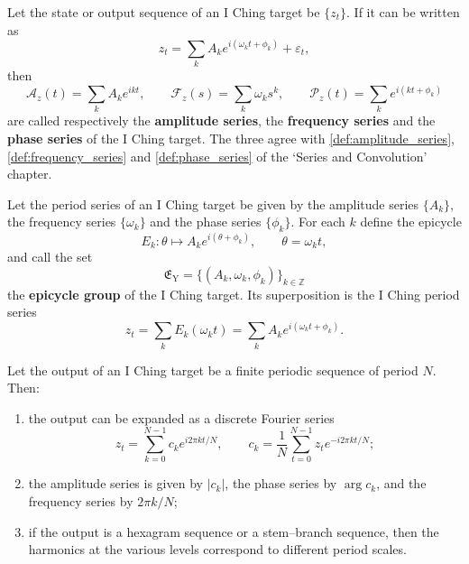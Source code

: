 \begin{definition}\label{def:yijing_series}
Let the state or output sequence of an I Ching target be $\{z_t\}$. If it can be written as
\[
z_t=\sum_k A_k e^{i(\omega_k t+\phi_k)}+\varepsilon_t,
\]
then
\[
\mathcal A_z(t)=\sum_k A_k e^{ikt},\qquad
\mathcal F_z(s)=\sum_k \omega_k s^k,\qquad
\mathcal P_z(t)=\sum_k e^{i(kt+\phi_k)}
\]
are called respectively the \textbf{amplitude series}, the \textbf{frequency series} and the \textbf{phase series} of the I Ching target. The three agree with \cref{def:amplitude_series}, \cref{def:frequency_series} and \cref{def:phase_series} of the `Series and Convolution' chapter.
\end{definition}

\begin{definition}\label{def:yijing_epicycle_group}
Let the period series of an I Ching target be given by the amplitude series $\{A_k\}$, the frequency series $\{\omega_k\}$ and the phase series $\{\phi_k\}$. For each $k$ define the epicycle
\[
E_k:\theta\mapsto A_k e^{i(\theta+\phi_k)},\qquad \theta=\omega_k t,
\]
and call the set
\[
\mathfrak E_{\mathrm{Y}}=\{(A_k,\omega_k,\phi_k)\}_{k\in\mathbb Z}
\]
the \textbf{epicycle group} of the I Ching target. Its superposition is the I Ching period series
\[
z_t=\sum_k E_k(\omega_k t)=\sum_k A_k e^{i(\omega_k t+\phi_k)}.
\]
\end{definition}

\begin{theorem}\label{thm:yijing_series_reconstruction}
Let the output of an I Ching target be a finite periodic sequence of period $N$. Then:
\begin{enumerate}[label=(\roman*)]
    \item the output can be expanded as a discrete Fourier series
    \[
    z_t=\sum_{k=0}^{N-1}c_k e^{i2\pi kt/N},\qquad
    c_k=\frac1N\sum_{t=0}^{N-1}z_t e^{-i2\pi kt/N};
    \]
    \item the amplitude series is given by $|c_k|$, the phase series by $\arg c_k$, and the frequency series by $2\pi k/N$;
    \item if the output is a hexagram sequence or a stem--branch sequence, then the harmonics at the various levels correspond to different period scales.
\end{enumerate}
\end{theorem}

